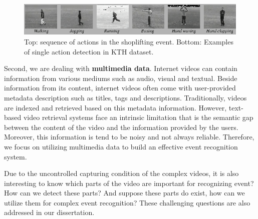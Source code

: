 \begin{figure}
	\centering
	\includegraphics[width=1\textwidth]{kth.png}
	\caption{Top: sequence of actions in the shoplifting event. Bottom: Examples of single action detection in KTH dataset.}
	\label{c1_comparision}
\end{figure}

Second, we are dealing with \textbf{multimedia data}. Internet videos can contain information from various mediums such as audio, visual and textual. Beside information from its content, internet videos often come with user-provided metadata description such as titles, tags and descriptions. Traditionally, videos are indexed and retrieved based on this metadata information. However, text-based video retrieval systems face an intrinsic limitation that is the semantic gap  between the content of the video and the information provided by the users. Moreover, this information is tend to be noisy and not always reliable. Therefore, we focus on utilizing multimedia data to build an effective event recognition system.

Due to the uncontrolled capturing condition of the complex videos, it is also interesting to know which parts of the video are important for recognizing event? How can we detect these parts? And suppose these parts do exist, how can we utilize them for complex event recognition? These challenging questions are also addressed in our dissertation.  

